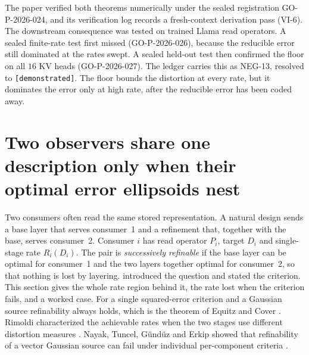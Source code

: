 The paper verified both theorems numerically under the sealed registration GO-P-2026-024, and its verification log records a fresh-context derivation pass (VI-6). The downstream consequence was tested on trained Llama read operators. A sealed finite-rate test first missed (GO-P-2026-026), because the reducible error still dominated at the rates swept. A sealed held-out test then confirmed the floor on all $16$ KV heads (GO-P-2026-027). The ledger carries this as NEG-13, resolved to \texttt{[demonstrated]}. The floor bounds the distortion at every rate, but it dominates the error only at high rate, after the reducible error has been coded away.



\section{Two observers share one description only when their optimal error ellipsoids nest}\label{sec:ch06:two}

Two consumers often read the same stored representation. A natural design sends a base layer that serves consumer~1 and a refinement that, together with the base, serves consumer~2. Consumer $i$ has read operator $P_i$, target $D_i$ and single-stage rate $R_i(D_i)$. The pair is \emph{successively refinable} if the base layer can be optimal for consumer~1 and the two layers together optimal for consumer~2, so that nothing is lost by layering.  introduced the question and stated the criterion. This section gives the whole rate region behind it, the rate lost when the criterion fails, and a worked case. For a single squared-error criterion and a Gaussian source refinability always holds, which is the theorem of Equitz and Cover \cite{equitzcover1991}. Rimoldi characterized the achievable rates when the two stages use different distortion measures \cite{rimoldi1994}. Nayak, Tuncel, G\"und\"uz and Erkip showed that refinability of a vector Gaussian source can fail under individual per-component criteria \cite{nayak2010}.

